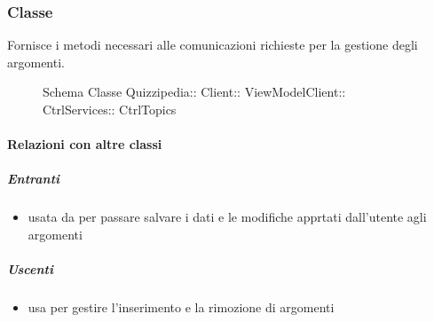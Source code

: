 \subsubsection{Classe }
Fornisce i metodi necessari alle comunicazioni richieste per la gestione degli argomenti.
\begin{figure}[H]
\centering
\noindent{}
\caption[Schema Classe CtrlTopics]{Schema Classe Quizzipedia:: Client:: ViewModelClient:: CtrlServices:: CtrlTopics}
\end{figure}
\paragraph{Relazioni con altre classi}
\subparagraph{Entranti}
\begin{itemize}
\item usata da  per passare salvare i dati e le modifiche apprtati dall'utente agli argomenti
\end{itemize}
\subparagraph{Uscenti}
\begin{itemize}
\item usa  per gestire l'inserimento e la rimozione di argomenti
\end{itemize}
